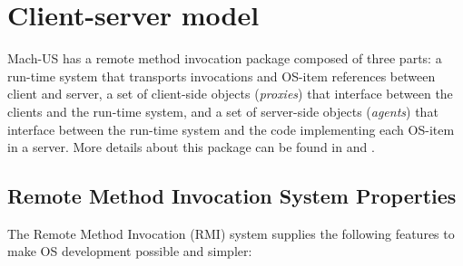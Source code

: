 \section{Client-server model}

Mach-US has a remote method invocation package composed of
three parts: a run-time system that
transports invocations and OS-item references between client and server,
a set of client-side objects ({\em proxies})
that interface between the clients and
the run-time system, and a set of server-side objects ({\em agents})
that interface
between the run-time system and the code implementing each OS-item in a
server.
More details about this package can be found in 
\cite{JMS-BIND} and \cite{PJG-RPC}.

\subsection{Remote Method Invocation System Properties}
The Remote Method Invocation (RMI)
system supplies the following features to make OS development
possible and simpler:
